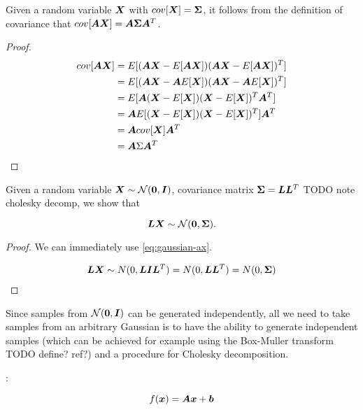 \begin{thm}
    Given a random variable ${\bm{X}}$ with $cov[{\bm{X}}] = {\bm{\Sigma}}$, it follows from the definition of covariance that $cov[{\bm{A}} {\bm{X}}] = {\bm{A}} {\bm{\Sigma}} {\bm{A}}^T$.
    
    \begin{proof}
    \begin{align}
    \label{eq:gaussian-ax}
    cov[{\bm{A}} {\bm{X}}] &= E[({\bm{A}} {\bm{X}} - E[{\bm{A}} {\bm{X}}])({\bm{A}} {\bm{X}} - E[{\bm{A}} {\bm{X}}])^T] \\
    &= E[({\bm{A}} {\bm{X}} - {\bm{A}} E[{\bm{X}}])({\bm{A}} {\bm{X}} - {\bm{A}} E[{\bm{X}}])^T] \\
    &= E[{\bm{A}} ({\bm{X}} - E[{\bm{X}}])({\bm{X}} - E[{\bm{X}}])^T {\bm{A}}^T] \\
    &= {\bm{A}} E[({\bm{X}} - E[{\bm{X}}])({\bm{X}} - E[{\bm{X}}])^T] {\bm{A}}^T \\
    &= {\bm{A}} cov[{\bm{X}}] {\bm{A}}^T \\
    &= {\bm{A}} \Sigma {\bm{A}}^T
    \end{align}
    \end{proof}
\end{thm}

\begin{thm}
    Given a random variable ${\bm{X}} \sim {\mathcal{N}}({\bm{0}}, {\bm{I}})$, covariance matrix ${\bm{\Sigma}} = {\bm{L}} {\bm{L}}^T$ {TODO note cholesky decomp}, we show that
    
    \begin{equation}
        {\bm{L}} {\bm{X}} \sim {\mathcal{N}}({\bm{0}}, {\bm{\Sigma}}).
    \end{equation}
    
    \begin{proof}
    We can immediately use \eqref{eq:gaussian-ax}.
    
    \begin{align}
    {\bm{L}} {\bm{X}} \sim N(0, {\bm{L}} {\bm{I}} {\bm{L}}^T) = N(0, {\bm{L}} {\bm{L}}^T) = N(0, {\bm{\Sigma}})
    \end{align}
    \end{proof}
\end{thm}

Since samples from ${\mathcal{N}}({\bm{0}}, {\bm{I}})$ can be generated independently, all we need to take samples from an arbitrary Gaussian is to have the ability to generate independent samples (which can be achieved for example using the Box-Muller transform {TODO define? ref?}) and a procedure for Cholesky decomposition.

\begin{defn}
    :
    
    \begin{equation}
        f({\bm{x}}) = {\bm{A}} {\bm{x}} + {\bm{b}}
    \end{equation}
\end{defn}
    
